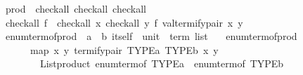 \begin{isabellebody}
\isanewline
{}\isamarkupfalse%
\isanewline
\isanewline
{}\isamarkupfalse%
\ prod\ {\isacharcolon}{\kern0pt}{\isacharcolon}{\kern0pt}\ {\isacharparenleft}{\kern0pt}check{\isacharunderscore}{\kern0pt}all{\isacharcomma}{\kern0pt}\ check{\isacharunderscore}{\kern0pt}all{\isacharparenright}{\kern0pt}\ check{\isacharunderscore}{\kern0pt}all\isanewline
{}\isanewline
\isanewline
{}\isamarkupfalse%
\ {\isachardoublequoteopen}check{\isacharunderscore}{\kern0pt}all\ f\ {\isacharequal}{\kern0pt}\ check{\isacharunderscore}{\kern0pt}all\ {\isacharparenleft}{\kern0pt}{\isasymlambda}x{\isachardot}{\kern0pt}\ check{\isacharunderscore}{\kern0pt}all\ {\isacharparenleft}{\kern0pt}{\isasymlambda}y{\isachardot}{\kern0pt}\ f\ {\isacharparenleft}{\kern0pt}valtermify{\isacharunderscore}{\kern0pt}pair\ x\ y{\isacharparenright}{\kern0pt}{\isacharparenright}{\kern0pt}{\isacharparenright}{\kern0pt}{\isachardoublequoteclose}\isanewline
\isanewline
{}\isamarkupfalse%
\ enum{\isacharunderscore}{\kern0pt}term{\isacharunderscore}{\kern0pt}of{\isacharunderscore}{\kern0pt}prod\ {\isacharcolon}{\kern0pt}{\isacharcolon}{\kern0pt}\ {\isachardoublequoteopen}{\isacharparenleft}{\kern0pt}{\isacharprime}{\kern0pt}a\ {\isacharasterisk}{\kern0pt}\ {\isacharprime}{\kern0pt}b{\isacharparenright}{\kern0pt}\ itself\ {\isasymRightarrow}\ unit\ {\isasymRightarrow}\ term\ list{\isachardoublequoteclose}\isanewline
\ \ \ {\isachardoublequoteopen}enum{\isacharunderscore}{\kern0pt}term{\isacharunderscore}{\kern0pt}of{\isacharunderscore}{\kern0pt}prod\ {\isacharequal}{\kern0pt}\isanewline
\ \ \ \ {\isacharparenleft}{\kern0pt}{\isasymlambda}{\isacharunderscore}{\kern0pt}\ {\isacharunderscore}{\kern0pt}{\isachardot}{\kern0pt}\isanewline
\ \ \ \ \ \ map\ {\isacharparenleft}{\kern0pt}{\isasymlambda}{\isacharparenleft}{\kern0pt}x{\isacharcomma}{\kern0pt}\ y{\isacharparenright}{\kern0pt}{\isachardot}{\kern0pt}\ termify{\isacharunderscore}{\kern0pt}pair\ TYPE{\isacharparenleft}{\kern0pt}{\isacharprime}{\kern0pt}a{\isacharparenright}{\kern0pt}\ TYPE{\isacharparenleft}{\kern0pt}{\isacharprime}{\kern0pt}b{\isacharparenright}{\kern0pt}\ x\ y{\isacharparenright}{\kern0pt}\isanewline
\ \ \ \ \ \ \ \ {\isacharparenleft}{\kern0pt}List{\isachardot}{\kern0pt}product\ {\isacharparenleft}{\kern0pt}enum{\isacharunderscore}{\kern0pt}term{\isacharunderscore}{\kern0pt}of\ {\isacharparenleft}{\kern0pt}TYPE{\isacharparenleft}{\kern0pt}{\isacharprime}{\kern0pt}a{\isacharparenright}{\kern0pt}{\isacharparenright}{\kern0pt}\ {\isacharparenleft}{\kern0pt}{\isacharparenright}{\kern0pt}{\isacharparenright}{\kern0pt}\ {\isacharparenleft}{\kern0pt}enum{\isacharunderscore}{\kern0pt}term{\isacharunderscore}{\kern0pt}of\ {\isacharparenleft}{\kern0pt}TYPE{\isacharparenleft}{\kern0pt}{\isacharprime}{\kern0pt}b{\isacharparenright}{\kern0pt}{\isacharparenright}{\kern0pt}\ {\isacharparenleft}{\kern0pt}{\isacharparenright}{\kern0pt}{\isacharparenright}{\kern0pt}{\isacharparenright}{\kern0pt}{\isacharparenright}{\kern0pt}{\isachardoublequoteclose}\isanewline

\end{isabellebody}
